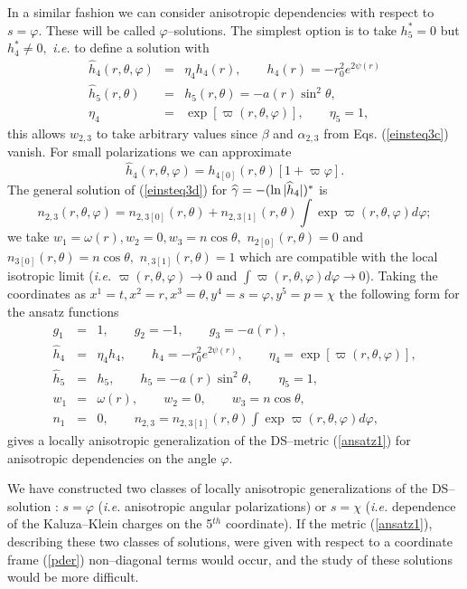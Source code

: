 \documentclass[a4paper,preprint,prabib,aps]{revtex4}
\begin{document}
In a similar fashion we can consider anisotropic dependencies with respect
to $s=\varphi $. These will be called $\varphi $--solutions. The simplest
option is to take $h_{5}^{\ast }=0$ but $h_{4}^{\ast }\neq 0,$ {\it i.e.} to
define a solution with
\begin{eqnarray*}
{\widehat{h}}_{4}(r,\theta ,\varphi ) &=&\eta _{4}h_{4}(r),\qquad
h_{4}(r)=-r_{0}^{2}e^{2\psi (r)} \\
\widehat{h}_{5}(r,\theta ) &=&h_{5}(r,\theta )=-a(r)\sin ^{2}\theta , \\
\eta _{4} &=&\exp [\varpi (r,\theta ,\varphi )],\qquad \eta _{5}=1,
\end{eqnarray*}
this allows $w_{2,3}$ to take arbitrary values since $\beta $ and $\alpha
_{2,3}$ from Eqs. (\ref{einsteq3c}) vanish. For small polarizations we can
approximate
\[
{\widehat{h}}_{4}(r,\theta ,\varphi )=h_{4[0]}(r,\theta )[1+\varpi \varphi ].
\]
The general solution of (\ref{einsteq3d}) for ${\widehat{\gamma }}=-(\ln |{%
\widehat{h}_{4}}|)^{\ast }$ is
\[
n_{2,3}(r,\theta ,\varphi )=n_{2,3[0]}(r,\theta )+n_{2,3[1]}(r,\theta )\int
\exp \varpi (r,\theta ,\varphi )d\varphi ;
\]
we take $w_{1}=\omega (r),w_{2}=0,w_{3}=n\cos \theta ,$ $n_{2[0]}(r,\theta
)=0$ and $n_{3[0]}(r,\theta )=n\cos \theta ,$ $n_{,3[1]}(r,\theta )=1$ which
are compatible with the local isotropic limit ({\it i.e.} $\varpi (r,\theta
,\varphi )\rightarrow 0$ and $\int \varpi (r,\theta ,\varphi )d\varphi
\rightarrow 0$). Taking the coordinates as $x^{1}=t,x^{2}=r,x^{3}=\theta
,y^{4}=s=\varphi ,y^{5}=p=\chi $ the following form for the ansatz functions
\begin{eqnarray}
g_{1} &=&1,\qquad g_{2}=-1,\qquad g_{3}=-a(r),  \label{set2b} \\
\widehat{h}_{4} &=&\eta _{4}h_{4},\qquad h_{4}=-r_{0}^{2}e^{2\psi
(r)},\qquad \eta _{4}=\exp [\varpi (r,\theta ,\varphi )],  \nonumber \\
\widehat{h}_{5} &=&h_{5},\qquad h_{5}=-a(r)\sin ^{2}\theta ,\qquad \eta
_{5}=1,\qquad   \nonumber \\
w_{1} &=&\omega (r),\qquad w_{2}=0,\qquad w_{3}=n\cos \theta ,  \nonumber \\
n_{1} &=&0,\qquad n_{2,3}=n_{2,3[1]}(r,\theta )\int \exp \varpi (r,\theta
,\varphi )d\varphi ,  \nonumber
\end{eqnarray}
gives a locally anisotropic generalization of the DS--metric (\ref{ansatz1})
for anisotropic dependencies on the angle $\varphi $.

We have constructed two classes of locally anisotropic generalizations of
the DS--solution : $s=\varphi$ ({\it i.e.} anisotropic angular
polarizations) or $s=\chi $ ({\it i.e.} dependence of the Kaluza--Klein
charges on the 5$^{th}$ coordinate). If the metric (\ref{ansatz1}),
describing these two classes of solutions, were given with respect to a
coordinate frame (\ref{pder}) non--diagonal terms would occur, and the study
of these solutions would be more difficult.
\end{document}
